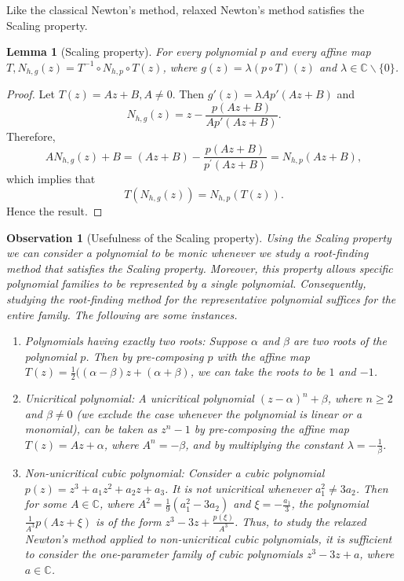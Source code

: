 \documentclass[12pt]{article}
\newtheorem{lem}{Lemma}[section]
\newtheorem{obs}[thm]{Observation}
\numberwithin{equation}{section}
\begin{document}
Like the classical Newton's method, relaxed Newton's method satisfies the Scaling property.
\begin{lem}[Scaling property]
For every polynomial $p$ and every affine map $T, N_{h, g}(z)=T^{-1}\circ N_{h, p}\circ T(z)$, where $g(z)=\lambda (p\circ T)(z)$ and $\lambda \in \mathbb{C} \backslash\{0\}$.
\end{lem}
\begin{proof}
Let $T(z)=A z+B, A \neq 0$.
Then $g'(z)=\lambda A p'(A z+B)$ and
$$N_{h, g}(z)=z-\frac{p(A z+B)}{A p'(A z+B)}.$$
Therefore,
$$A N_{h, g}(z)+B =(A z+B)-\frac{p(A z+B)}{p^{\prime}(A z+B)} =N_{h, p}(A z+B),$$
which implies that
$$T\left(N_{h, g}(z)\right) =N_{h, p}(T(z)).$$
Hence the result.
\end{proof}
\begin{obs}[Usefulness of the Scaling property]\label{Use_SP}
Using the Scaling property we can consider a polynomial to be monic whenever we study a root-finding method that satisfies the Scaling property. Moreover, this property allows specific polynomial families to be represented by a single polynomial. Consequently, studying the root-finding method for the representative polynomial suffices for the entire family. The following are some instances.
\begin{enumerate}
\item Polynomials having exactly two roots: Suppose $\alpha$ and $\beta$ are two roots of the polynomial $p$. Then by pre-composing $p$ with the affine map $T(z)=\frac{1}{2}((\alpha -\beta)z+(\alpha +\beta)$, we can take the roots to be $1$ and $-1$. 
\item  Unicritical polynomial: A unicritical polynomial $(z-\alpha)^n+\beta$, where $n\geq 2$ and $\beta \neq 0 $ (we exclude the case whenever the polynomial is linear or a monomial), can be taken as $z^n-1$ by pre-composing the affine map $T(z)=Az+\alpha$, where $A^n=-\beta$, and by multiplying the constant $\lambda=-\frac{1}{\beta}$.
\item Non-unicritical cubic polynomial: Consider a cubic polynomial $p(z)=z^3+a_1z^2+a_2z+a_3$. It is not unicritical whenever $a_1^2\neq 3a_2$. Then for some $A\in \mathbb{C}$, where $A^2=\frac{1}{9}(a_1^2-3a_2)$ and $\xi= -\frac{a_1}{3}$, the polynomial $\frac{1}{A^3}p(Az+\xi)$ is of the form $z^3-3z+\frac{p(\xi)}{A^3}$. Thus, to study the relaxed Newton's method applied to non-unicritical cubic polynomials, it is sufficient to consider the one-parameter family of cubic polynomials $z^3-3z+a$, where $a\in \mathbb{C}$. 
\end{enumerate}  
\end{obs}
\end{document}
